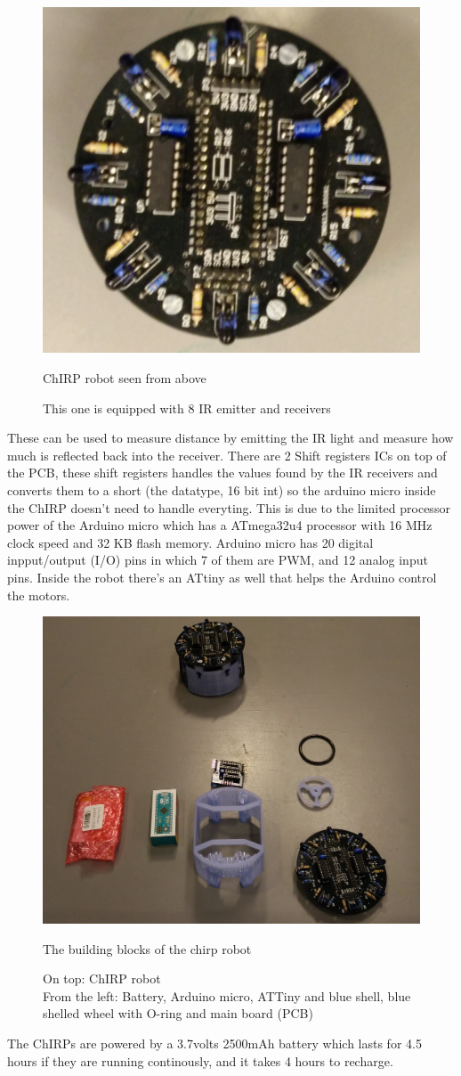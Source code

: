 \begin{figure}[h]
\centering
\includegraphics[width=0.8\linewidth]{images/chirpAbove.jpg}
\caption{ChIRP robot seen from above}
\caption*{This one is equipped with 8 IR emitter and receivers}
\end{figure}
These can be used to measure distance by emitting the IR light and measure how much is reflected back into the receiver. There are 2 Shift registers ICs on top of the PCB, these shift registers handles the values found by the IR receivers and converts them to a short (the datatype, 16 bit int) so the arduino micro inside the ChIRP doesn't need to handle everyting. This is due to the limited processor power of the Arduino micro which has a ATmega32u4 processor with 16 MHz clock speed and 32 KB flash memory. Arduino micro has 20 digital inpput/output (I/O) pins in which 7 of them are PWM, and 12 analog input pins. Inside the robot there's an ATtiny as well that helps the Arduino control the motors.


\begin{figure}[h]
\centering
\includegraphics[width=0.8\linewidth]{images/chirpPieces.jpg}
\caption{The building blocks of the chirp robot}
\caption*{On top: ChIRP robot\\From the left: Battery, Arduino micro, ATTiny and blue shell, blue shelled wheel with O-ring and main board (PCB)}
\end{figure}
The ChIRPs are powered by a 3.7volts 2500mAh battery which lasts for 4.5 hours if they are running continously, and it takes 4 hours to recharge.

